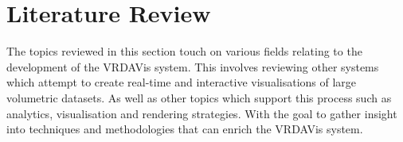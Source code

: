 \section{Literature Review}
\label{sec:lit-review}
The topics reviewed in this section touch on various fields relating to the development of the VRDAVis system.
This involves reviewing other systems which attempt to create real-time and interactive visualisations of large volumetric datasets. 
As well as other topics which support this process such as analytics, visualisation and rendering strategies.
With the goal to gather insight into techniques and methodologies that can enrich the VRDAVis system. 






